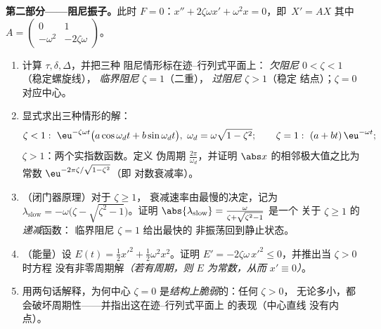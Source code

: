 \begin{problem}
\medskip
\noindent\textbf{第二部分——阻尼振子。}此时 $F =
0$：$x'' + 2\zeta\omega x' + \omega^2x = 0$，即\ $X' = AX$
其中 $A = \begin{pmatrix} 0 & 1\\ -\omega^2 &
-2\zeta\omega\end{pmatrix}$。
\begin{enumerate}[resume]
  \item 计算 $\tau, \delta, \Delta$，并把三种
        阻尼情形标在迹--行列式平面上：
        \emph{欠阻尼} $0 < \zeta < 1$（稳定螺旋线），
        \emph{临界阻尼} $\zeta = 1$（二重），
        \emph{过阻尼} $\zeta > 1$（稳定
        结点）；$\zeta = 0$ 对应中心。
  \item 显式求出三种情形的解：
        \[
        \zeta < 1:\ \eu^{-\zeta\omega t}\bigl(a\cos\omega_d t
        + b\sin\omega_dt\bigr),\ \omega_d =
        \omega\sqrt{1-\zeta^2};
        \qquad
        \zeta = 1:\ (a + bt)\,\eu^{-\omega t};
        \]
        $\zeta > 1$：两个实指数函数。定义
        伪周期 $\frac{2\pi}{\omega_d}$，并证明
        $\abs x$ 的相邻极大值之比为
        常数 $\eu^{-2\pi\zeta/\sqrt{1-\zeta^2}}$（即
        对数衰减率）。
  \item （闭门器原理）对于 $\zeta \geq 1$，
        衰减速率由最慢的决定，记为
        $\lambda_{\mathrm{slow}} = -\omega\bigl(\zeta -
        \sqrt{\zeta^2-1}\bigr)$。证明
        $\abs{\lambda_{\mathrm{slow}}} =
        \frac{\omega}{\zeta + \sqrt{\zeta^2 - 1}}$ 是一个
        关于 $\zeta \geq 1$ 的\emph{递减}函数：
        临界阻尼 $\zeta = 1$ 给出最快的
        非振荡回到静止状态。
  \item （能量）设 $E(t) = \frac12x'^2 +
        \frac12\omega^2x^2$。证明 $E' = -2\zeta\omega\,x'^2
        \leq 0$，并推出当 $\zeta > 0$ 时方程
        没有非零周期解\emph{（若有周期，则 $E$
        为常数，从而 $x' \equiv 0$）}。
  \item 用两句话解释，为何中心 $\zeta = 0$
        是\emph{结构上脆弱}的：任何 $\zeta > 0$，
        无论多小，都会破坏周期性——并指出这在迹--行列式平面上
        的表现（中心直线
        没有内点）。
\end{enumerate}


\end{problem}
